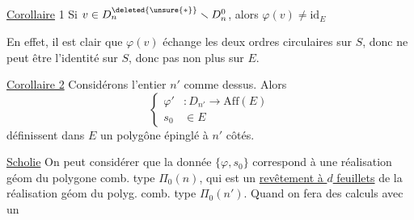 \uline{Corollaire} 1 Si $v\in D_n^{\deleted{\unsure{*}}}\smallsetminus D_n^0$, alors $\varphi(v)\ne\mathrm{id}_E$

En effet,  il est clair que $\varphi(v)$ échange les deux ordres circulaires  sur $S$,   donc ne peut être l'identité sur $S$, donc pas non plus sur $E$.

\uline{Corollaire 2} Considérons  l'entier $n'$ comme  dessus. Alors 
\[
\left\{\begin{aligned}
\varphi' &:D_{n'}\longrightarrow\mathrm{Aff}(E)\\
s_0&\in E
\end{aligned}\right.
\]
définissent dans $E$ un polygône épinglé à $n'$ côtés.

\uline{Scholie} On peut considérer que la donnée $\{\varphi,s_0\}$ correspond à une réalisation géom du polygone comb. type $\Pi_0(n)$, qui est un \uline{revêtement à $d$ feuillets} de la réalisation géom  du polyg. comb. type $\Pi_0(n')$. Quand on fera des calculs avec un
